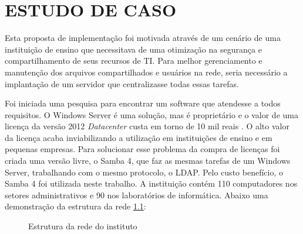 \chapter{ESTUDO DE CASO}

Esta proposta de implementação foi motivada através de um cenário de uma instituição de ensino que necessitava de uma otimização na segurança e compartilhamento de seus recursos de TI. Para melhor gerenciamento e manutenção dos arquivos compartilhados e usuários na rede, seria necessário a implantação de um servidor que centralizasse todas essas tarefas.

Foi iniciada uma pesquisa para encontrar um software que atendesse a todos requisitos. O Windows Server é uma solução, mas é proprietário e o valor de uma licença da versão 2012 \textit{Datacenter} custa em torno de 10 mil reais \cite{SERVER}. O alto valor da licença acaba inviabilizando a utilização em instituições de ensino e em pequenas empresas. 
Para solucionar esse problema da compra de licenças foi criada uma versão livre, o Samba 4, que faz as mesmas tarefas de um Windows Server, trabalhando com o mesmo protocolo, o LDAP. Pelo custo benefício, o Samba 4 foi utilizada neste trabalho.
A instituição contém 110 computadores nos setores administrativos e 90 nos laboratórios de informática. Abaixo uma demonstração da estrutura da rede \ref{rede}:

\begin{figure}[h!]
   	\centering
   	\caption{Estrutura da rede do instituto}
    \label{rede}
\end{figure}

